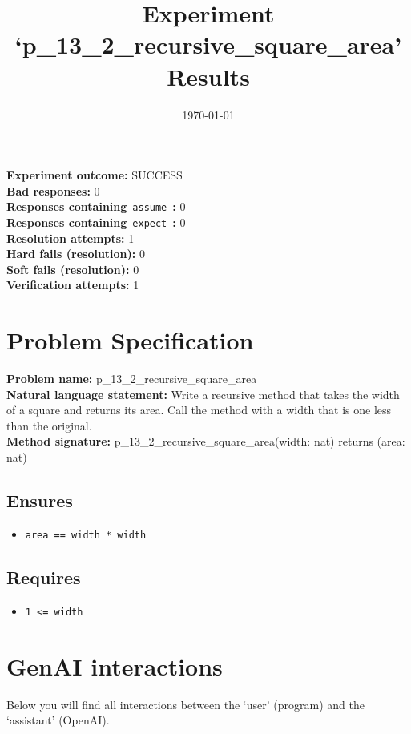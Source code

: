 \documentclass{article}
\begin{document}
\title{Experiment `p\_13\_2\_recursive\_square\_area' Results}
\author{\today}
\date{}
\maketitle
\textbf{Experiment outcome: }SUCCESS
\\\textbf{Bad responses: }0
\\\textbf{Responses containing}~\texttt{assume}~\textbf{: }0
\\\textbf{Responses containing}~\texttt{expect}~\textbf{: }0
\\\textbf{Resolution attempts: }1
\\\textbf{Hard fails (resolution): }0
\\\textbf{Soft fails (resolution): }0
\\\textbf{Verification attempts: }1
\section*{Problem Specification}
\textbf{Problem name: }p\_13\_2\_recursive\_square\_area
\\\textbf{Natural language statement: }Write a recursive method that takes the width of a square and returns its area. Call the method with a width that is one less than the original.
\\\textbf{Method signature: }p\_13\_2\_recursive\_square\_area(width: nat) returns (area: nat)
\subsection*{Ensures}
\begin{itemize}
\item \texttt{area == width * width}
\end{itemize}
\subsection*{Requires}
\begin{itemize}
\item \texttt{1 <= width}
\end{itemize}
\clearpage
\section*{GenAI interactions}
Below you will find all interactions between the `user' (program) and the `assistant' (OpenAI).
\end{document}
